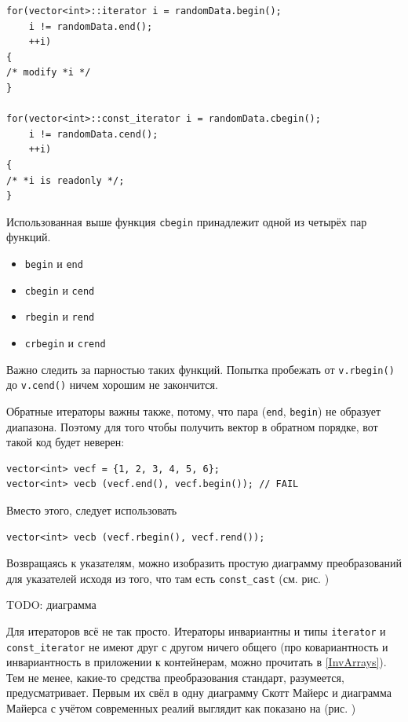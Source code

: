 \documentclass[a4paper,12pt,oneside]{article}
\begin{document}
\begin{lstlisting}
for(vector<int>::iterator i = randomData.begin(); 
    i != randomData.end(); 
    ++i) 
{
/* modify *i */
}

for(vector<int>::const_iterator i = randomData.cbegin(); 
    i != randomData.cend(); 
    ++i) 
{
/* *i is readonly */;
}
\end{lstlisting}

Использованная выше функция \lstinline!cbegin! принадлежит одной из четырёх пар функций.

\begin{itemize}
\item \lstinline!begin! и \lstinline!end!
\item \lstinline!cbegin! и \lstinline!cend!
\item \lstinline!rbegin! и \lstinline!rend!
\item \lstinline!crbegin! и \lstinline!crend!
\end{itemize}

Важно следить за парностью таких функций. Попытка пробежать от \lstinline!v.rbegin()! до \lstinline!v.cend()! ничем хорошим не закончится.

Обратные итераторы важны также, потому, что пара (\lstinline!end!, \lstinline!begin!) не образует диапазона. Поэтому для того чтобы получить вектор в обратном порядке, вот такой код будет неверен:

\begin{lstlisting}
vector<int> vecf = {1, 2, 3, 4, 5, 6};
vector<int> vecb (vecf.end(), vecf.begin()); // FAIL
\end{lstlisting}

Вместо этого, следует использовать

\begin{lstlisting}
vector<int> vecb (vecf.rbegin(), vecf.rend());
\end{lstlisting}

Возвращаясь к указателям, можно изобразить простую диаграмму преобразований для указателей исходя из того, что там есть \lstinline!const_cast! (см. рис. )

TODO: диаграмма

Для итераторов всё не так просто. Итераторы инвариантны и типы \lstinline!iterator! и \lstinline!const_iterator! не имеют друг с другом ничего общего (про ковариантность и инвариантность в приложении к контейнерам, можно прочитать в \ref{InvArrays}). Тем не менее, какие-то средства преобразования стандарт, разумеется, предусматривает. Первым их свёл в одну диаграмму Скотт Майерс и диаграмма Майерса с учётом современных реалий выглядит как показано на (рис. )
\end{document}
